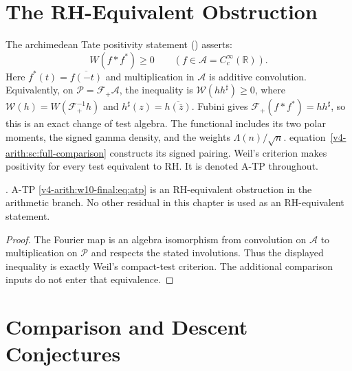 \section{The RH-Equivalent Obstruction}
\label{v4-arith:w10-final:tier1}

The archimedean Tate positivity statement
() asserts:
\begin{equation}
\label{v4-arith:w10-final:eq:atp}
W(f*f^*)\ge0\qquad(f\in\mathscr A=C_c^\infty(\mathbb R)).
\end{equation}
Here $f^*(t)=\overline{f(-t)}$ and multiplication in $\mathscr A$
is additive convolution. Equivalently, on
$\mathscr P=\mathcal F_+\mathscr A$, the inequality is
$\mathcal W(hh^\sharp)\ge0$, where
$\mathcal W(h)=W(\mathcal F_+^{-1}h)$ and
$h^\sharp(z)=\overline{h(\bar z)}$.
Fubini gives $\mathcal F_+(f*f^*)=h h^\sharp$, so this is an
exact change of test algebra. The functional includes its two polar
moments, the signed gamma density, and the weights
$\Lambda(n)/\sqrt n$. equation~\eqref{v4-arith:sc:full-comparison} constructs
its signed pairing. Weil's criterion makes positivity for every test
equivalent to RH. It is denoted A-TP throughout.

\begin{proposition}
\label{v4-arith:w10-final:prop:tier1}
\ClaimStatusProvedHere. A-TP
\eqref{v4-arith:w10-final:eq:atp} is an RH-equivalent obstruction in
the arithmetic branch.  No other residual in this chapter is used as an
RH-equivalent statement.
\end{proposition}

\begin{proof}
The Fourier map is an algebra isomorphism from convolution on
$\mathscr A$ to multiplication on $\mathscr P$ and respects the
stated involutions. Thus the displayed inequality is exactly Weil's
compact-test criterion. The additional comparison inputs do not enter
that equivalence.
\end{proof}

\section{Comparison and Descent Conjectures}
\label{v4-arith:w10-final:tier2}

